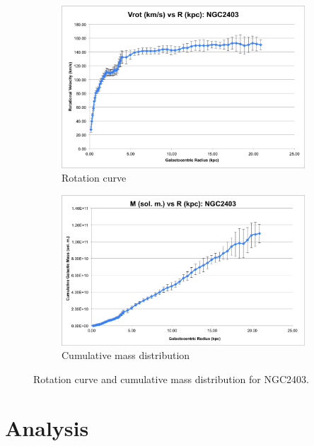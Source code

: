 \documentclass{article}
\begin{document}
\begin{figure}
    \centering
    \begin{subfigure}{0.4\textwidth}
        \includegraphics[width=\textwidth]{vrot/Vrot-5}
        \caption{Rotation curve}
    \end{subfigure}
    \hfill
    \begin{subfigure}{0.4\textwidth}
        \includegraphics[width=\textwidth]{m/M-5}
        \caption{Cumulative mass distribution}
    \end{subfigure}
    \caption{Rotation curve and cumulative mass distribution for NGC2403.}
    \label{fig:ngc2403}
\end{figure}

\section{Analysis}\label{sec:analysis}
\end{document}

